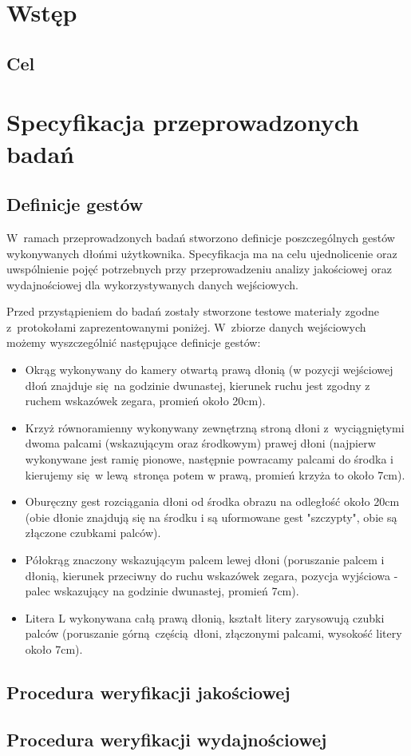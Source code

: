 \chapter{Wstęp}\label{Chapter_Wstep}

\section{Cel}\label{Section_Cel}

\chapter{Specyfikacja przeprowadzonych badań}\label{Chapter_SpecyfikacjaPrzeprowadzonychBadan}

\section{Definicje gestów}\label{Section_DefinicjeGestow}

W~ramach przeprowadzonych badań stworzono definicje poszczególnych gestów wykonywanych dłońmi użytkownika. Specyfikacja ma na celu ujednolicenie oraz uwspólnienie pojęć potrzebnych przy przeprowadzeniu analizy jakościowej oraz wydajnościowej dla wykorzystywanych danych wejściowych.

Przed przystąpieniem do badań zostały stworzone testowe materiały zgodne z~protokołami zaprezentowanymi poniżej. W~zbiorze danych wejściowych możemy wyszczególnić następujące definicje gestów:

\begin{itemize}
  \item Okrąg wykonywany do kamery otwartą prawą dłonią (w pozycji wejściowej dłoń znajduje się na godzinie dwunastej, kierunek ruchu jest zgodny z ruchem wskazówek zegara, promień około 20cm).
  \item Krzyż równoramienny wykonywany zewnętrzną stroną dłoni z~wyciągniętymi dwoma palcami (wskazującym oraz środkowym) prawej dłoni (najpierw wykonywane jest ramię pionowe, następnie powracamy palcami do środka i kierujemy się w lewą stronęa potem w prawą, promień krzyża to około 7cm).
  \item Oburęczny gest rozciągania dłoni od środka obrazu na odległość około 20cm (obie dłonie znajdują się na środku i są uformowane gest "szczypty", obie są złączone czubkami palców).
  \item Półokrąg znaczony wskazującym palcem lewej dłoni (poruszanie palcem i dłonią, kierunek przeciwny do ruchu wskazówek zegara, pozycja wyjściowa - palec wskazujący na godzinie dwunastej, promień 7cm).
  \item Litera L wykonywana całą prawą dłonią, kształt litery zarysowują czubki palców (poruszanie górną częścią dłoni, złączonymi palcami, wysokość litery około 7cm).
\end{itemize}

\section{Procedura weryfikacji jakościowej}\label{Section_ProceduraWeryfikacjiJakosciowej}

\section{Procedura weryfikacji wydajnościowej}\label{Section_ProceduraWeryfikacjiWydajnosciowej}